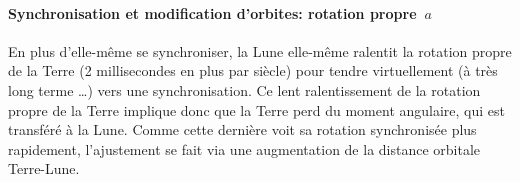 
\sk
\paragraph{Synchronisation et modification d'orbites: rotation propre~$a$} En plus d'elle-même se synchroniser, la Lune elle-même ralentit la rotation propre de la Terre (2 millisecondes en plus par siècle) pour tendre virtuellement (à très long terme \ldots) vers une synchronisation. Ce lent ralentissement de la rotation propre de la Terre implique donc que la Terre perd du moment angulaire, qui est transféré à la Lune. Comme cette dernière voit sa rotation synchronisée plus rapidement, l'ajustement se fait via une augmentation de la distance orbitale Terre-Lune.


\sk
